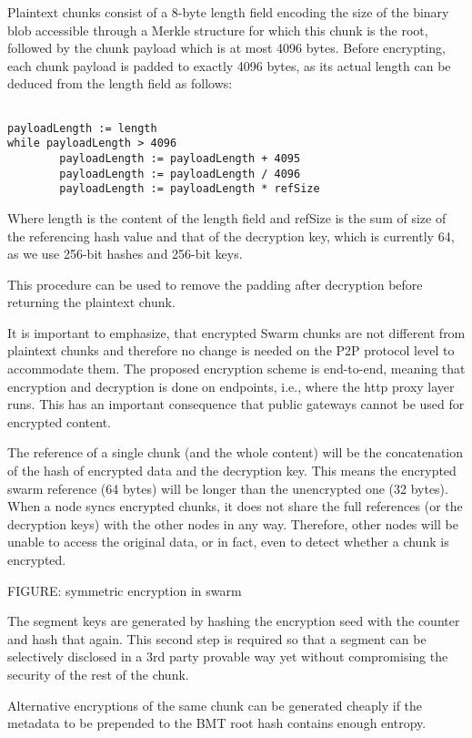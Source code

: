 
Plaintext chunks consist of a 8-byte length field encoding the size of the binary blob accessible through a Merkle structure for which this chunk is the root, followed by the chunk payload which is at most 4096 bytes. Before encrypting, each chunk payload is padded to exactly 4096 bytes, as its actual length can be deduced from the length field as follows:

\begin{lstlisting}

payloadLength := length
while payloadLength > 4096
        payloadLength := payloadLength + 4095
        payloadLength := payloadLength / 4096
        payloadLength := payloadLength * refSize
\end{lstlisting}

Where length is the content of the length field and refSize is the sum of size of the referencing hash value and that of the decryption key, which is currently 64, as we use 256-bit hashes and 256-bit keys.

This procedure can be used to remove the padding after decryption before returning the plaintext chunk. 


It is important to emphasize, that encrypted Swarm chunks are not different from plaintext chunks and therefore no change is needed on the P2P protocol level to accommodate them. The proposed encryption scheme is end-to-end, meaning that encryption and decryption is done on endpoints, i.e., where the http proxy layer runs. This has an important consequence that public gateways cannot be used for encrypted content.

The reference of a single chunk (and the whole content) will be the concatenation of the hash of encrypted data and the decryption key. This means the encrypted  swarm reference (64 bytes) will be longer than the unencrypted one (32 bytes). When a node syncs encrypted chunks, it does not share the full references (or the decryption keys) with the other nodes in any way.  Therefore, other nodes will be unable to access the original data, or in fact, even to detect whether a chunk is encrypted.
        

FIGURE: symmetric encryption in swarm 


The segment keys are generated by hashing the encryption seed with the counter and hash that again. This second step is required so that a segment can be selectively disclosed in a 3rd party provable way yet without compromising the security of the rest of the chunk.

Alternative encryptions of the same chunk can be generated cheaply if the metadata to be prepended to the BMT root hash contains enough entropy.
